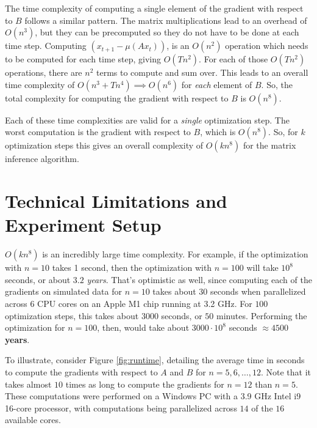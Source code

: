 \documentclass[12pt]{article}
\theoremstyle{definition}
\begin{document}
The time complexity of computing a single element of the gradient with respect to $B$ follows a similar pattern. The matrix multiplications lead to an overhead of $O(n^3)$, but they can be precomputed so they do not have to be done at each time step. Computing $(x_{t+1} - \mu(Ax_t))$, is an $O(n^2)$ operation which needs to be computed for each time step, giving $O(Tn^2)$. For each of those $O(Tn^2)$ operations, there are $n^2$ terms to compute and sum over. This leads to an overall time complexity of $O(n^3 + Tn^4) \implies O(n^6)$ for \textit{each} element of $B$. So, the total complexity for computing the gradient with respect to $B$ is $O(n^8)$.

Each of these time complexities are valid for a \textit{single} optimization step. The worst computation is the gradient with respect to $B$, which is $O(n^8)$. So, for $k$ optimization steps this gives an overall complexity of $O(kn^8)$ for the matrix inference algorithm.

\section{Technical Limitations and Experiment Setup}

$O(kn^8)$ is an incredibly large time complexity. For example, if the optimization with $n=10$ takes 1 second, then the optimization with $n=100$ will take $10^8$ seconds, or about $3.2$ \textit{years}. That's optimistic as well, since computing each of the gradients on simulated data for $n=10$ takes about $30$ seconds when parallelized across 6 CPU cores on an Apple M1 chip running at 3.2 GHz. For $100$ optimization steps, this takes about $3000$ seconds, or $50$ minutes. Performing the optimization for $n=100$, then, would take about $3000 \cdot 10^8$ seconds $\approx 4500$ \textbf{years}.

To illustrate, consider Figure \ref{fig:runtime}, detailing the average time in seconds to compute the gradients with respect to $A$ and $B$ for $n = 5, 6, \ldots, 12$. Note that it takes almost $10$ times as long to compute the gradients for $n=12$ than $n=5$. These computations were performed on a Windows PC with a 3.9 GHz Intel i9 16-core processor, with computations being parallelized across $14$ of the $16$ available cores.
\end{document}
